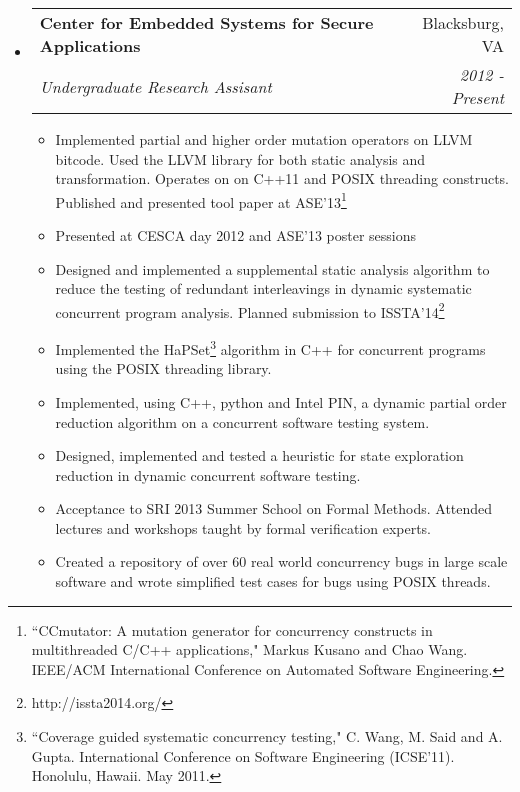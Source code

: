 \documentclass[letterpaper,11pt]{article}
\makeatletter
\newcommand{\resitem}[1]{\item #1 \vspace{-2pt}}
\newcommand{\resheading}[1]{{\large \parashade[.9]{sharpcorners}{\textbf{#1 \vphantom{p\^{E}}}}}}
\newcommand{\ressubheading}[4]{
\begin{tabular*}{6.5in}{l@{\extracolsep{\fill}}r}
		\textbf{#1} & #2 \\
		\textit{#3} & \textit{#4} \\
\end{tabular*}\vspace{-6pt}}
\makeatother
\begin{document}
\resheading{Research Experience}
\begin{itemize}
\item
    \ressubheading{Center for Embedded Systems for Secure Applications}{Blacksburg, VA}{Undergraduate Research Assisant}{2012 - Present}
    \begin{itemize}
        \resitem{Implemented partial and higher order mutation operators on
          LLVM bitcode. Used the LLVM library for both static analysis and
          transformation. Operates on on C++11 and POSIX threading constructs.
          Published and presented tool paper at ASE'13\footnote{``CCmutator: A mutation
          generator for concurrency constructs in multithreaded C/C++
          applications," Markus Kusano and Chao Wang. IEEE/ACM International
          Conference on Automated Software Engineering.}}
        \resitem{Presented at CESCA day 2012 and ASE'13 poster sessions}
        \resitem{Designed and implemented a supplemental static analysis
          algorithm to reduce the testing of redundant interleavings
          in dynamic systematic concurrent program analysis. Planned submission
          to ISSTA'14\footnote{http://issta2014.org/}}
        \resitem{Implemented the HaPSet\footnote{``Coverage guided systematic
        concurrency testing," C. Wang, M. Said and A. Gupta. International
        Conference on Software Engineering (ICSE'11). Honolulu, Hawaii. May 2011.}
        algorithm in C++ for concurrent programs using the POSIX threading
        library.}
        \resitem{Implemented, using C++, python and Intel PIN, a dynamic
        partial order reduction algorithm on a concurrent software testing
        system.}
        \resitem{Designed, implemented and tested a heuristic for state
        exploration reduction in dynamic concurrent software testing.}
        \resitem{Acceptance to SRI 2013 Summer School on Formal Methods.
        Attended lectures and workshops taught by formal verification experts.}
        \resitem{Created a repository of over 60 real world concurrency bugs in
        large scale software and wrote simplified test cases for bugs using
        POSIX threads.}
    \end{itemize}
\end{itemize}
\end{document}
